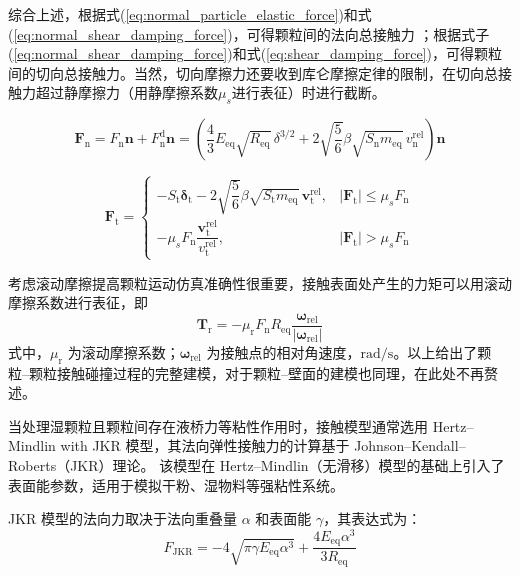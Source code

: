 综合上述，根据式(\ref{eq:normal_particle_elastic_force})和式(\ref{eq:normal_shear_damping_force})，可得颗粒间的法向总接触力 ；根据式子(\ref{eq:normal_shear_damping_force})和式(\ref{eq:shear_damping_force})，可得颗粒间的切向总接触力。当然，切向摩擦力还要收到库仑摩擦定律的限制，在切向总接触力超过静摩擦力（用静摩擦系数\(\mu_s\)进行表征）时进行截断。

\begin{equation}
    \bm{F}_{\mathrm{n}} = F_{\mathrm{n}}\bm{n} + F_{\mathrm{n}}^{\mathrm{d}}\bm{n} = \left(\frac{4}{3}E_{\mathrm{eq}}\sqrt{R_{\mathrm{eq}}}\,\delta^{3/2} + 2\sqrt{\frac{5}{6}}\beta\sqrt{S_{\mathrm{n}}m_{\mathrm{eq}}}\,v_{\mathrm{n}}^{\mathrm{rel}}\right)\bm{n}
    \label{eq:total_normal_force}
\end{equation}

\begin{equation}
    \bm{F}_{\mathrm{t}} = 
    \begin{cases}
        -S_{\mathrm{t}}\bm{\delta}_{\mathrm{t}} - 2\sqrt{\dfrac{5}{6}}\beta\sqrt{S_{\mathrm{t}}m_{\mathrm{eq}}}\,\bm{v}_{\mathrm{t}}^{\mathrm{rel}}, & |\bm{F}_{\mathrm{t}}| \leq \mu_s F_{\mathrm{n}} \\[10pt]
        -\mu_s F_{\mathrm{n}} \dfrac{\bm{v}_{\mathrm{t}}^{\mathrm{rel}}}{v_{\mathrm{t}}^{\mathrm{rel}}}, & |\bm{F}_{\mathrm{t}}| > \mu_s F_{\mathrm{n}}
    \end{cases}
    \label{eq:total_shear_force}
\end{equation}

考虑滚动摩擦提高颗粒运动仿真准确性很重要，接触表面处产生的力矩可以用滚动摩擦系数进行表征，即
\begin{equation}
    \bm{T}_{\mathrm{r}} = -\mu_{\mathrm{r}} F_{\mathrm{n}} R_{\mathrm{eq}} \frac{\bm{\omega}_{\mathrm{rel}}}{|\bm{\omega}_{\mathrm{rel}}|}
    \label{eq:rolling_torque}
\end{equation}
式中，\(\mu_{\mathrm{r}}\) 为滚动摩擦系数；\(\bm{\omega}_{\mathrm{rel}}\) 为接触点的相对角速度，\(\mathrm{rad/s}\)。以上给出了颗粒--颗粒接触碰撞过程的完整建模，对于颗粒--壁面的建模也同理，在此处不再赘述。

当处理湿颗粒且颗粒间存在液桥力等粘性作用时，接触模型通常选用 Hertz--Mindlin with JKR 模型，其法向弹性接触力的计算基于 Johnson--Kendall--Roberts（JKR）理论。
该模型在 Hertz--Mindlin（无滑移）模型的基础上引入了表面能参数，适用于模拟干粉、湿物料等强粘性系统。

JKR 模型的法向力取决于法向重叠量 $\alpha$ 和表面能 $\gamma$，其表达式为：
\begin{equation}
    F_{\mathrm{JKR}}
    = -4\sqrt{\pi\gamma E_{\mathrm{eq}}\alpha^{3}}
    + \frac{4E_{\mathrm{eq}}\alpha^{3}}{3R_{\mathrm{eq}}}
    \label{eq:JKR_force}
\end{equation}


